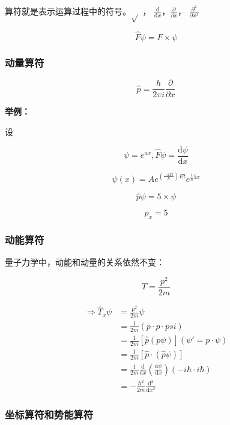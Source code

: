 \documentclass[a4paper]{ctexrep}
\renewcommand{\d}{\mathrm{d}}
\begin{document}
    算符就是表示运算过程中的符号。$\sqrt{}$ ， $\frac{\mathrm{d}}{\mathrm{d}x}$，$\frac{\partial}{\partial x}$， $\frac{\partial^2}{\partial x^2}$

    \[\hat{F}\psi = F \times \psi \]

    \subsubsection{动量算符}
    
    \[\hat{p} = \frac{h}{2 \pi i} \frac{\partial}{\partial x}\]

    \textbf{举例：}
    
    设
    
    \[\psi = e^{ax}, \hat{F}\psi = \frac{\d \psi}{\d x} \]

    \[
        \psi(x) = Ae^{\left(\frac{-2\pi i}{\hbar}\right)Et} e^{\frac{i}{\hbar}5x}
    \]

    \[
        \hat{p} \psi = 5 \times \psi   
    \]

    \[
        p_x = 5  
    \]

    \subsubsection{动能算符}

    量子力学中，动能和动量的关系依然不变：
    
    \[
        T = \frac{p^2}{2m}  
    \]

    \begin{align*}
        \Rightarrow \hat{T}_x \psi &= \frac{p^2}{2m} \psi  \\
        &= \frac{1}{2m}(p \cdot p \cdot psi) \\ 
        &= \frac{1}{2m} \left[\hat{p} \left( p \psi \right) \right] \left(
            \psi ' = p \cdot \psi
         \right) \\ 
        &= \frac{1}{2m} \left[ \hat{p} \cdot \left(
            \hat{p} \psi
         \right) \right] \\
        &= \frac{1}{2m} \frac{\d}{\d x} \left( \frac{\d \psi}{\d x} \right) \left( -i \hbar \cdot i \hbar \right) \\
        &= - \frac{\hbar^2}{2m} \frac{\d ^2}{\d x^2}
    \end{align*}

    \subsubsection{坐标算符和势能算符}
\end{document}
